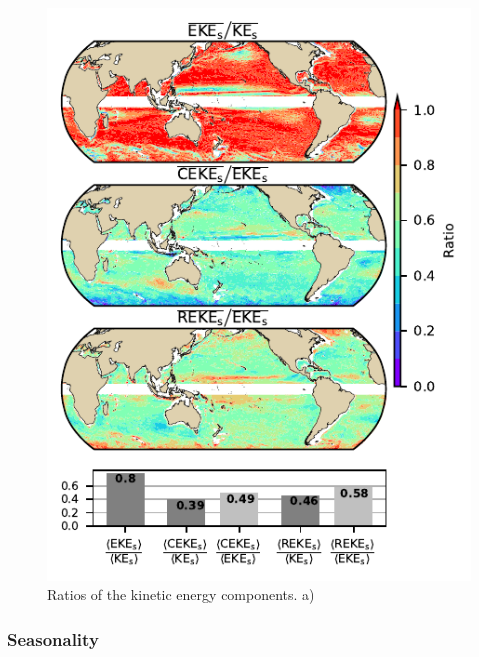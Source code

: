 \documentclass[draft]{agujournal2019}
\begin{document}
	\begin{figure}
	    \centering
	    \includegraphics[width=1\textwidth]{figures/eke_ratio_map_all.pdf}
	    \caption{Ratios of the kinetic energy components. a) }
	    \label{fig:my_label}
	\end{figure}

	\subsubsection{Seasonality}
\end{document}
